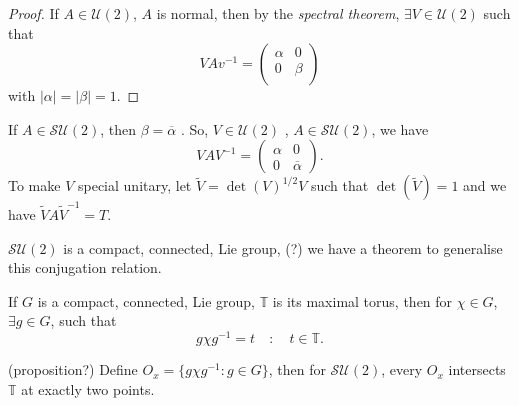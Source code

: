 \documentclass{article}
\begin{document}
\begin{proof}
    If $A \in \mathcal{U}(2)$, $A$ is normal, then by the \textit{spectral theorem}, $\exists V \in \mathcal{U}(2)$ such that
    \begin{equation}
        VA v^{-1} = 
        \begin{pmatrix}
            \alpha & 0 \\
            0 & \beta \\
        \end{pmatrix}
    \end{equation}
    with $| \alpha | = | \beta | = 1$.
\end{proof}

If $A \in \mathcal{SU}(2)$, then $\beta = \overline{\alpha}$ . So, $V \in \mathcal{U}(2)$ , $A \in \mathcal{SU}(2)$, we have
\[
    VAV^{-1} = 
    \begin{pmatrix}
        \alpha & 0 \\
        0 & \overline{\alpha}
    \end{pmatrix}.
\]
To make $V$ special unitary, let $\tilde{V} = \det\left( V \right)^{1/2}V$ such that $\det\left( \tilde{V} \right) = 1$ and we have $\tilde{V}A\tilde{V}^{-1}=T$.

$\mathcal{SU}(2)$ is a compact, connected, Lie group, (?) we have a theorem to generalise this conjugation relation.

\begin{theorem}
    If $G$ is a compact, connected, Lie group, $\mathbb{T}$ is its maximal torus, then for $\chi \in G$, $\exists g \in G$, such that
    \begin{equation}
        g \chi g^{-1} = t \quad : \quad t \in \mathbb{T}.
    \end{equation}
\end{theorem}

\begin{theorem}
    (proposition?) Define $O_{x} = \{ g \chi g^{-1} : g \in G \}$, then for $\mathcal{SU}(2)$, every $O_{x}$ intersects $\mathbb{T}$ at exactly two points.
\end{theorem}
\end{document}
